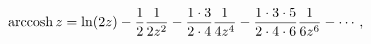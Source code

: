 \[\mathop{\mathrm{arccosh}\/}\nolimits z=\mathop{\ln\/}\nolimits\!\left(2z\right%
)-\frac{1}{2}\frac{1}{2z^{2}}-\frac{1\cdot 3}{2\cdot 4}\frac{1}{4z^{4}}-\frac{%
1\cdot 3\cdot 5}{2\cdot 4\cdot 6}\frac{1}{6z^{6}}-\cdots,\]